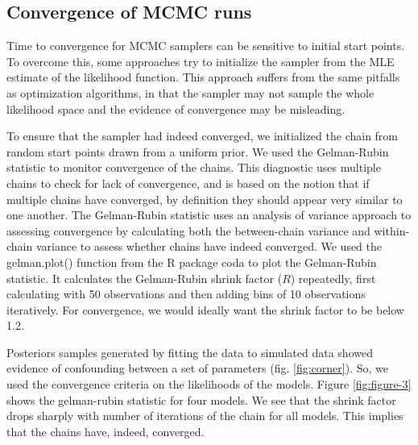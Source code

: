 \subsection{Convergence of MCMC runs}

Time to convergence for MCMC samplers can be sensitive to initial start points. To overcome this, some approaches try to initialize the sampler from the MLE estimate of the likelihood function. This approach suffers from the same pitfalls as optimization algorithms, in that the sampler may not sample the whole likelihood space and the evidence of convergence may be misleading.

To ensure that the sampler had indeed converged, we initialized the chain from random start points drawn from a uniform prior. We used the Gelman-Rubin statistic \cite{brooks97} to monitor convergence of the chains. This diagnostic uses multiple chains to check for lack of convergence, and is based on the notion that if multiple chains have converged, by definition they should appear very similar to one another. The Gelman-Rubin statistic uses an analysis of variance approach to assessing convergence by calculating both the between-chain variance and within-chain variance to assess whether chains have indeed converged. We used the gelman.plot() function from the R \cite{r08} package coda \cite{plummer06} to plot the Gelman-Rubin statistic. It calculates the Gelman-Rubin shrink factor ($R$) repeatedly, first calculating with 50 observations and then adding bins of 10 observations iteratively. For convergence, we would ideally want the shrink factor to be below 1.2. 

Posteriors samples generated by fitting the data to simulated data showed evidence of confounding between a set of parameters (fig. \ref{fig:corner}). So, we used the convergence criteria on the likelihoods of the models. Figure \ref{fig:figure-3} shows the gelman-rubin statistic for four models. We see that the shrink factor drops sharply with number of iterations of the chain for all models. This implies that the chains have, indeed, converged. 

